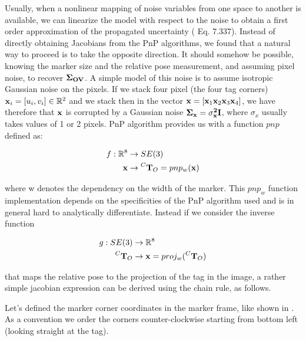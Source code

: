Usually, when a nonlinear mapping of noise variables from one space to another is available, we can linearize the model with respect to the noise
to obtain a first order approximation of the propagated uncertainty (\cite{barfoot2017state} Eq. 7.337).  
Instead of directly obtaining Jacobians from the PnP algorithms, we found that a natural way to proceed is to take the opposite 
direction. It should somehow be possible, knowing the marker size and the relative pose measurement, and assuming pixel noise, to
recover $\bf \Sigma_{OV}$. A simple model of this noise is to assume isotropic Gaussian noise on the pixels. If we stack four pixel (the four tag corners) 
${\bf x}_i = [u_i, v_i] \in \mathbb{R}^2$ and we stack then in the vector ${\bf x} = [{\bf x}_1 {\bf x}_2 {\bf x}_3 {\bf x}_4]$, we have therefore that
${\bf x}$ is corrupted by a Gaussian noise $\bf \Sigma_{{\bf x}} = \sigma_{x}^2 {\bf I}$, where $\sigma_{x}$ usually takes values of 1 or 2 pixels.
PnP algorithm provides us with a function $pnp$ defined as:

\begin{equation}
    \begin{split}
        f: \mathbb{R}^8 &\rightarrow SE(3) \\
                           {\bf x} &\rightarrow \prescript{C}{}{{\bf T}}_{O} = pnp_w({\bf x})
    \end{split}
\end{equation}

where w denotes the dependency on the width of the marker. This $pnp_w$ function implementation depends on the specificities of the PnP algorithm used and  
is in general hard to analytically differentiate. Instead if we consider the inverse function

\begin{equation}
    \begin{split}
        g: SE(3) &\rightarrow \mathbb{R}^8 \\
                           \prescript{C}{}{{\bf T}}_{O} &\rightarrow {\bf x} = proj_w(\prescript{C}{}{{\bf T}}_{O})
    \end{split}
\end{equation}

that maps the relative pose to the projection of the tag in the image, a rather simple jacobian expression can be derived using the chain rule, as follows.

Let's defined the marker corner coordinates in the marker frame, like shown in . As a convention 
\cite{wang2016iros} we order the corners counter-clockwise starting from bottom left (looking straight at the tag). 

